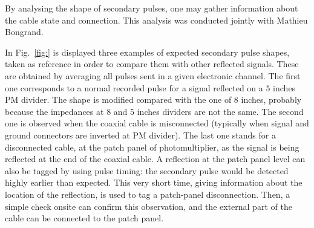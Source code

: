 By analysing the shape of secondary pulses, one may gather information about the cable state and connection.
This analysis was conducted jointly with Mathieu Bongrand.

In Fig.~\ref{fig:} is displayed three examples of expected secondary pulse shapes, taken as reference in order to compare them with other reflected signals.
These are obtained by averaging all pulses sent in a given electronic channel.
The first one corresponds to a normal recorded pulse for a signal reflected on a $5$ inches PM divider.
The shape is modified compared with the one of $8$ inches, probably because the impedances at $8$ and $5$ inches dividers are not the same.
The second one is observed when the coaxial cable is misconnected (typically when signal and ground connectors are inverted at PM divider).
The last one stands for a disconnected cable, at the patch panel of photomultiplier, as the signal is being reflected at the end of the coaxial cable.
A reflection at the patch panel level can also be tagged by using pulse timing: the secondary pulse would be detected highly earlier than expected.
This very short time, giving information about the location of the reflection, is used to tag a patch-panel disconnection.
Then, a simple check onsite can confirm this observation, and the external part of the cable can be connected to the patch panel.
